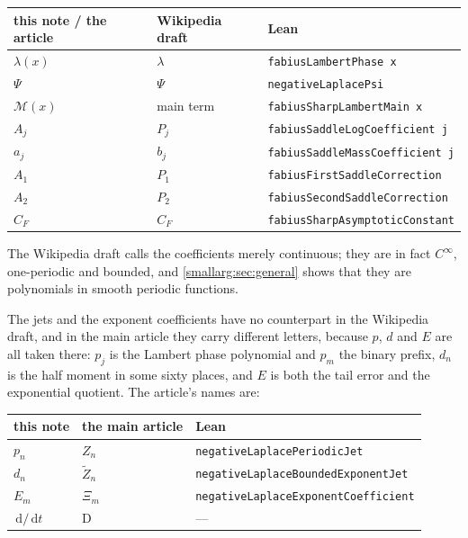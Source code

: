 \documentclass[11pt,oneside]{article}
\theoremstyle{definition}
\theoremstyle{remark}
\newcommand{\dd}{\,\mathrm d}
\begin{document}
\begin{center}
\begin{tabular}{@{}lll@{}}
\toprule
this note / the article & Wikipedia draft & Lean\\
\midrule
$\lambda(x)$ & $\lambda$ & \texttt{fabiusLambertPhase x}\\
$\Psi$ & $\Psi$ & \texttt{negativeLaplacePsi}\\
$\mathcal M(x)$ & main term & \texttt{fabiusSharpLambertMain x}\\
$A_j$ & $P_j$ & \texttt{fabiusSaddleLogCoefficient j}\\
$a_j$ & $b_j$ & \texttt{fabiusSaddleMassCoefficient j}\\
$A_1$ & $P_1$ & \texttt{fabiusFirstSaddleCorrection}\\
$A_2$ & $P_2$ & \texttt{fabiusSecondSaddleCorrection}\\
$C_F$ & $C_F$ & \texttt{fabiusSharpAsymptoticConstant}\\
\bottomrule
\end{tabular}
\end{center}

The Wikipedia draft calls the coefficients merely continuous; they are in fact
$C^\infty$, one-periodic and bounded, and \cref{smallarg:sec:general} shows that they are
polynomials in smooth periodic functions.

The jets and the exponent coefficients have no counterpart in the Wikipedia
draft, and in the main article they carry different letters, because $p$, $d$
and $E$ are all taken there: $p_j$ is the Lambert phase polynomial and $p_m$
the binary prefix, $d_n$ is the half moment in some sixty places, and $E$ is
both the tail error and the exponential quotient.  The article's names are:

\begin{center}
\begin{tabular}{@{}lll@{}}
\toprule
this note & the main article & Lean\\
\midrule
$p_n$ & $Z_n$ & \texttt{negativeLaplacePeriodicJet}\\
$d_n$ & $\widetilde Z_n$ & \texttt{negativeLaplaceBoundedExponentJet}\\
$E_m$ & $\Xi_m$ & \texttt{negativeLaplaceExponentCoefficient}\\
$\dd/\dd t$ & $\mathrm D$ & ---\\
\bottomrule
\end{tabular}
\end{center}
\end{document}
